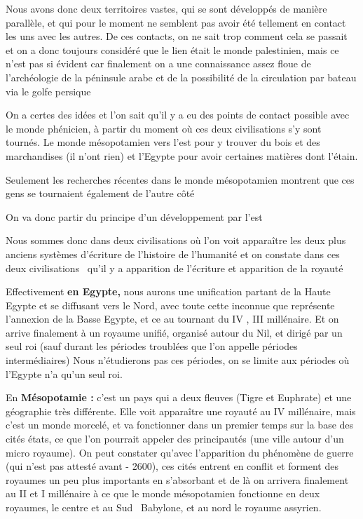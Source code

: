 \documentclass[a4paper]{article}
\begin{document}
\bigskip

{
Nous avons donc deux territoires vastes, qui se sont développés de
manière parallèle, et qui pour le moment ne semblent pas avoir été
tellement en contact les uns avec les autres. De ces contacts, on ne
sait trop comment cela se passait et on a donc toujours considéré que
le lien était le monde palestinien, mais ce n'est pas si évident car
finalement on a une connaissance assez floue de l'archéologie de la
péninsule arabe et de la possibilité de la circulation par bateau via
le golfe persique}

{
On a certes des idées et l'on sait qu'il y a eu des points de contact
possible avec le monde phénicien, à partir du moment où ces deux
civilisations s'y sont tournés. Le monde mésopotamien vers l'est pour y
trouver du bois et des marchandises (il n'ont rien) et l'Egypte pour
avoir certaines matières dont l'étain.}

{
Seulement les recherches récentes dans le monde mésopotamien montrent
que ces gens se tournaient également de l'autre côté}


\bigskip

{
On va donc partir du principe d'un développement par l'est}

{
Nous sommes donc dans deux civilisations où l'on voit apparaître les
deux plus anciens systèmes d'écriture de l'histoire de l'humanité et on
constate dans ces deux civilisations \ qu'il y a apparition de
l'écriture et apparition de la royauté}


\bigskip

{
Effectivement \textbf{en Egypte,} nous aurons une unification partant de
la Haute Egypte et se diffusant vers le Nord, avec toute cette inconnue
que représente l'annexion de la Basse Egypte, et ce au tournant du IV ,
III millénaire. Et on arrive finalement à un royaume unifié, organisé
autour du Nil, et dirigé par un seul roi (sauf durant les périodes
troublées que l'on appelle périodes intermédiaires) Nous n'étudierons
pas ces périodes, on se limite aux périodes où l'Egypte n'a qu'un seul
roi.}


\bigskip

{
En \textbf{Mésopotamie : }c'est un pays qui a deux fleuves (Tigre et
Euphrate) et une géographie très différente. Elle voit apparaître une
royauté au IV millénaire, mais c'est un monde morcelé, et va
fonctionner dans un premier temps sur la base des cités états, ce que
l'on pourrait appeler des principautés (une ville autour d'un micro
royaume). On peut constater qu'avec l'apparition du phénomène de guerre
(qui n'est pas attesté avant - 2600), ces cités entrent en conflit et
forment des royaumes un peu plus importants en s'absorbant et de là on
arrivera finalement au II et I millénaire à ce que le monde
mésopotamien fonctionne en deux royaumes, le centre et au Sud
\ Babylone, et au nord le royaume assyrien.}
\end{document}
